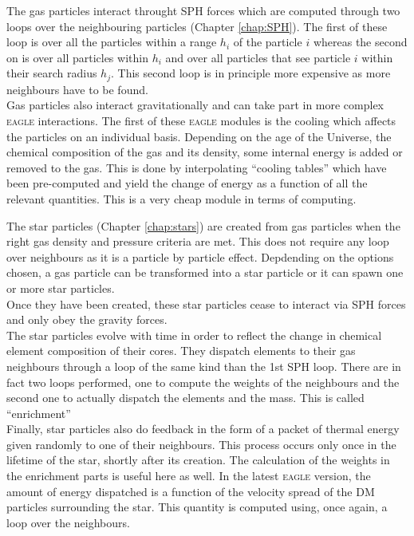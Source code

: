 \documentclass[a4paper,10pt]{report}
\newcommand{\eagle}{\textsc{eagle }}
\begin{document}
The gas particles interact throught SPH forces which are computed through two loops over the neighbouring particles
(Chapter \ref{chap:SPH}). The first of these loop is over all the particles within a range $h_i$ of the particle $i$
whereas the second on is over all particles within $h_i$ and over all particles that see particle $i$ within their
search radius $h_j$. This second loop is in principle more expensive as more neighbours have to be found. \\
Gas particles also interact gravitationally and can take part in more complex \eagle interactions. The first of these
\eagle modules is the cooling  which affects the particles on an individual basis. Depending on the age of the
Universe, the chemical composition of the gas and its density, some internal energy is added or removed to the gas.
This is done by interpolating ``cooling tables'' which have been pre-computed and yield the change of energy as a
function of all the relevant quantities. This is a very cheap module in terms of computing.

The star particles (Chapter \ref{chap:stars}) are created from gas particles when the right gas density and pressure
criteria are met. This does not require any loop over neighbours as it is a particle by particle effect. Depdending on
the options chosen, a gas particle can be transformed into a star particle or it can spawn one or more star particles.\\
Once they have been created, these star particles cease to interact via SPH forces and only obey the gravity forces. \\
The star particles evolve with time in order to reflect the change in chemical element composition of their cores.
They dispatch elements to their gas neighbours through a loop of the same kind than the 1st SPH loop. There are in fact
two loops performed, one to compute the weights of the neighbours and the second one to actually dispatch the elements
and the mass. This is called ``enrichment''\\
Finally, star particles also do feedback in the form of a packet of thermal energy given randomly to one of their
neighbours. This process occurs only once in the lifetime of the star, shortly after its creation. The calculation of
the weights in the enrichment parts is useful here as well. In the latest \eagle version, the amount of energy
dispatched is a function of the velocity spread of the DM particles surrounding the star. This quantity is computed
using, once again, a loop over the neighbours. \\
\end{document}
